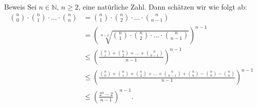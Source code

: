 \documentclass[10pt]{beamer}
\def\bN{\mathbb{N}}
\begin{document}
\begin{frame}{Beweis}
    Sei \( n \in \bN \), \( n \geq 2 \), eine natürliche Zahl. Dann schätzen wir wie folgt ab:
    \begin{align*}
        \binom{n}{0} \cdot \binom{n}{1} \cdot \ldots \cdot \binom{n}{n}
        & = \binom{n}{1} \cdot \binom{n}{2} \cdot \ldots \cdot \binom{n}{n - 1} \\
        & = \left( \sqrt[n - 1]{\binom{n}{1} \cdot \binom{n}{2} \cdot \ldots \cdot \binom{n}{n - 1}} \right)^{n - 1} \\
        & \leq \left( \frac{\binom{n}{1} + \binom{n}{2} + \ldots + \binom{n}{n - 1}}{n - 1} \right)^{n - 1} \\
        & \leq \left( \frac{\binom{n}{0} + \binom{n}{1} + \binom{n}{2} + \ldots + \binom{n}{n - 1} + \binom{n}{n} - \binom{n}{0} - \binom{n}{n}}{n - 1} \right)^{n - 1} \\
        & \leq \left( \frac{2^{n} - 2}{n - 1} \right)^{n - 1}.
    \end{align*}
\end{frame}
\end{document}
